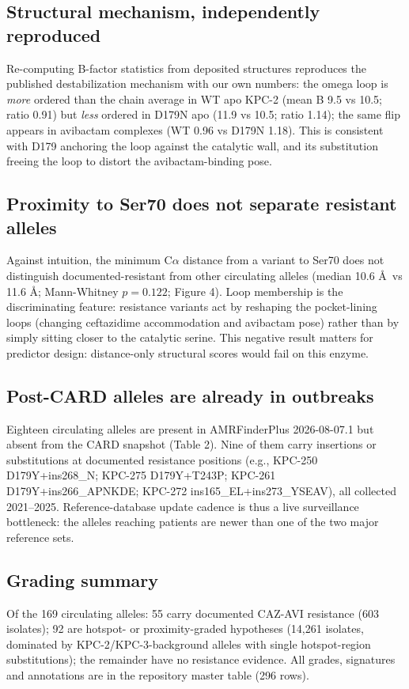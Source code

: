 \documentclass[11pt]{article}
\begin{document}
\subsection{Structural mechanism, independently reproduced}
Re-computing B-factor statistics from deposited structures reproduces the published destabilization mechanism with our own numbers: the omega loop is \emph{more} ordered than the chain average in WT apo KPC-2 (mean B 9.5 vs 10.5; ratio 0.91) but \emph{less} ordered in D179N apo (11.9 vs 10.5; ratio 1.14); the same flip appears in avibactam complexes (WT 0.96 vs D179N 1.18). This is consistent with D179 anchoring the loop against the catalytic wall, and its substitution freeing the loop to distort the avibactam-binding pose.

\subsection{Proximity to Ser70 does not separate resistant alleles}
Against intuition, the minimum C$\alpha$ distance from a variant to Ser70 does not distinguish documented-resistant from other circulating alleles (median 10.6 \AA\ vs 11.6 \AA; Mann-Whitney $p=0.122$; Figure 4). Loop membership is the discriminating feature: resistance variants act by reshaping the pocket-lining loops (changing ceftazidime accommodation and avibactam pose) rather than by simply sitting closer to the catalytic serine. This negative result matters for predictor design: distance-only structural scores would fail on this enzyme.

\subsection{Post-CARD alleles are already in outbreaks}
Eighteen circulating alleles are present in AMRFinderPlus 2026-08-07.1 but absent from the CARD snapshot (Table 2). Nine of them carry insertions or substitutions at documented resistance positions (e.g., KPC-250 D179Y+ins268\_N; KPC-275 D179Y+T243P; KPC-261 D179Y+ins266\_APNKDE; KPC-272 ins165\_EL+ins273\_YSEAV), all collected 2021--2025. Reference-database update cadence is thus a live surveillance bottleneck: the alleles reaching patients are newer than one of the two major reference sets.

\subsection{Grading summary}
Of the 169 circulating alleles: 55 carry documented CAZ-AVI resistance (603 isolates); 92 are hotspot- or proximity-graded hypotheses (14,261 isolates, dominated by KPC-2/KPC-3-background alleles with single hotspot-region substitutions); the remainder have no resistance evidence. All grades, signatures and annotations are in the repository master table (296 rows).
\end{document}
